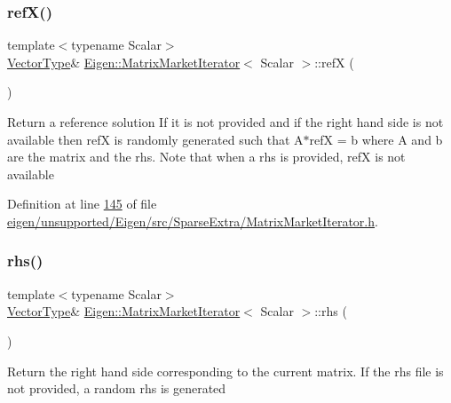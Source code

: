 \subsubsection{\texorpdfstring{ref\+X()}{refX()}\hspace{0.1cm}{\footnotesize\ttfamily [2/2]}}
{\footnotesize\ttfamily template$<$typename Scalar$>$ \\
\hyperlink{group___core___module}{Vector\+Type}\& \hyperlink{class_eigen_1_1_matrix_market_iterator}{Eigen\+::\+Matrix\+Market\+Iterator}$<$ Scalar $>$\+::refX (\begin{DoxyParamCaption}{ }\end{DoxyParamCaption})\hspace{0.3cm}{\ttfamily [inline]}}

Return a reference solution If it is not provided and if the right hand side is not available then refX is randomly generated such that A$\ast$refX = b where A and b are the matrix and the rhs. Note that when a rhs is provided, refX is not available 

Definition at line \hyperlink{eigen_2unsupported_2_eigen_2src_2_sparse_extra_2_matrix_market_iterator_8h_source_l00145}{145} of file \hyperlink{eigen_2unsupported_2_eigen_2src_2_sparse_extra_2_matrix_market_iterator_8h_source}{eigen/unsupported/\+Eigen/src/\+Sparse\+Extra/\+Matrix\+Market\+Iterator.\+h}.

\mbox{\label{class_eigen_1_1_matrix_market_iterator_ac141e537f3bc3a3c078a2780a6a956b6}} 
\subsubsection{\texorpdfstring{rhs()}{rhs()}\hspace{0.1cm}{\footnotesize\ttfamily [1/2]}}
{\footnotesize\ttfamily template$<$typename Scalar$>$ \\
\hyperlink{group___core___module}{Vector\+Type}\& \hyperlink{class_eigen_1_1_matrix_market_iterator}{Eigen\+::\+Matrix\+Market\+Iterator}$<$ Scalar $>$\+::rhs (\begin{DoxyParamCaption}{ }\end{DoxyParamCaption})\hspace{0.3cm}{\ttfamily [inline]}}

Return the right hand side corresponding to the current matrix. If the rhs file is not provided, a random rhs is generated 

